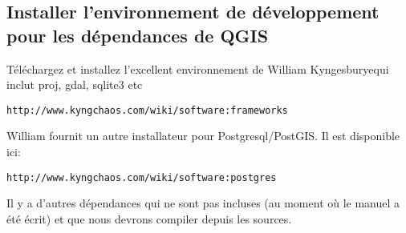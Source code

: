 % 
% 
% 
% 
% 

\subsection{Installer l'environnement de d\'eveloppement pour les d\'ependances de QGIS}
T\'el\'echargez et installez l'excellent environnement de William Kyngesburyequi inclut proj, gdal, sqlite3 etc

\begin{verbatim}
http://www.kyngchaos.com/wiki/software:frameworks
\end{verbatim}

William fournit un autre installateur pour Postgresql/PostGIS. Il est disponible ici:

\begin{verbatim}
http://www.kyngchaos.com/wiki/software:postgres 
\end{verbatim}

Il y a d'autres d\'ependances qui ne sont pas incluses (au moment o\`u le manuel a \'et\'e \'ecrit) et que nous devrons compiler depuis les sources.

% 
% 
% 

